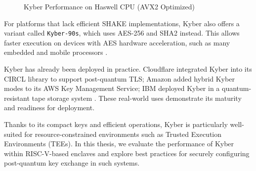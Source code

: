 \begin{figure}[h]
\centering
{}
\caption{Kyber Performance on Haswell CPU (AVX2 Optimized)}
\label{fig:kyber_perf}
\end{figure}

For platforms that lack efficient SHAKE implementations, Kyber also offers a variant called \texttt{Kyber-90s}, which uses AES-256 and SHA2 instead. This allows faster execution on devices with AES hardware acceleration, such as many embedded and mobile processors \cite{kyber2024}.

Kyber has already been deployed in practice. Cloudflare integrated Kyber into its CIRCL library to support post-quantum TLS; Amazon added hybrid Kyber modes to its AWS Key Management Service; IBM deployed Kyber in a quantum-resistant tape storage system \cite{kyber2024}. These real-world uses demonstrate its maturity and readiness for deployment.

Thanks to its compact keys and efficient operations, Kyber is particularly well-suited for resource-constrained environments such as Trusted Execution Environments (TEEs). In this thesis, we evaluate the performance of Kyber within RISC-V-based enclaves and explore best practices for securely configuring post-quantum key exchange in such systems.

